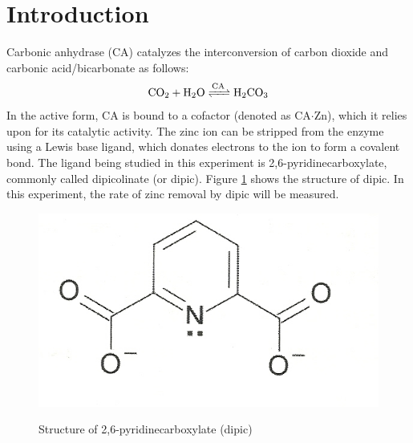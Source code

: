 \section{Introduction}
Carbonic anhydrase (CA) catalyzes the interconversion of carbon dioxide and carbonic acid/bicarbonate as follows:
\begin{align}\label{eqn:ca_reaction}
\ce{CO_2 + H_2O 
<=>[\ce{CA}] 
H_2CO_3}
\end{align}
In the active form, CA is bound to a  cofactor (denoted as CA$\cdot$Zn), which it relies upon for its catalytic activity. The zinc ion can be stripped from the enzyme using a Lewis base ligand, which donates electrons to the ion to form a covalent bond. The ligand being studied in this experiment is 2,6-pyridinecarboxylate, commonly called dipicolinate (or dipic). Figure \ref{fig:dipic} shows the structure of dipic. In this experiment, the rate of zinc removal by dipic will be measured.
\begin{figure}[h]
  \includegraphics[scale=0.5]{./Figures/dipic.jpg}\\
  \caption{Structure of 2,6-pyridinecarboxylate (dipic)\cite{bib:lab_manual}}\label{fig:dipic}
\end{figure}
 
